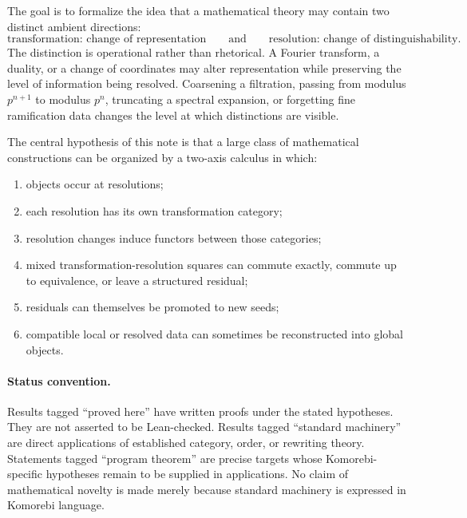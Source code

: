 \documentclass[11pt]{article}
\theoremstyle{definition}
\theoremstyle{remark}
\begin{document}
The goal is to formalize the idea that a mathematical theory may contain two distinct ambient directions:
\[
\boxed{\text{transformation: change of representation}}
\qquad\text{and}\qquad
\boxed{\text{resolution: change of distinguishability}.}
\]
The distinction is operational rather than rhetorical. A Fourier transform, a duality, or a change of coordinates may alter representation while preserving the level of information being resolved. Coarsening a filtration, passing from modulus $p^{n+1}$ to modulus $p^n$, truncating a spectral expansion, or forgetting fine ramification data changes the level at which distinctions are visible.

The central hypothesis of this note is that a large class of mathematical constructions can be organized by a two-axis calculus in which:
\begin{enumerate}
    \item objects occur at resolutions;
    \item each resolution has its own transformation category;
    \item resolution changes induce functors between those categories;
    \item mixed transformation-resolution squares can commute exactly, commute up to equivalence, or leave a structured residual;
    \item residuals can themselves be promoted to new seeds;
    \item compatible local or resolved data can sometimes be reconstructed into global objects.
\end{enumerate}

\paragraph{Status convention.}
Results tagged ``proved here'' have written proofs under the stated hypotheses. They are not asserted to be Lean-checked. Results tagged ``standard machinery'' are direct applications of established category, order, or rewriting theory. Statements tagged ``program theorem'' are precise targets whose Komorebi-specific hypotheses remain to be supplied in applications. No claim of mathematical novelty is made merely because standard machinery is expressed in Komorebi language.
\end{document}

